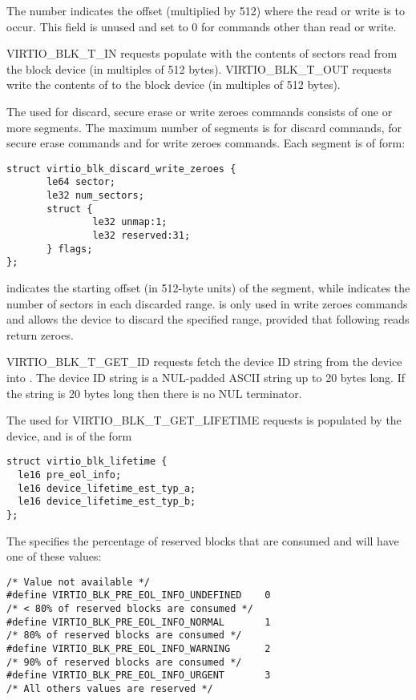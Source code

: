 The  number indicates the offset (multiplied by 512) where
the read or write is to occur. This field is unused and set to 0 for
commands other than read or write.

VIRTIO_BLK_T_IN requests populate  with the contents of sectors
read from the block device (in multiples of 512 bytes).  VIRTIO_BLK_T_OUT
requests write the contents of  to the block device (in multiples
of 512 bytes).

The  used for discard, secure erase or write zeroes commands
consists of one or more segments. The maximum number of segments is
 for discard commands,  for
secure erase commands and  for write zeroes
commands.
Each segment is of form:

\begin{lstlisting}
struct virtio_blk_discard_write_zeroes {
       le64 sector;
       le32 num_sectors;
       struct {
               le32 unmap:1;
               le32 reserved:31;
       } flags;
};
\end{lstlisting}

 indicates the starting offset (in 512-byte units) of the
segment, while  indicates the number of sectors in each
discarded range.  is only used in write zeroes commands and allows
the device to discard the specified range, provided that following reads return
zeroes.

VIRTIO_BLK_T_GET_ID requests fetch the device ID string from the device into
.  The device ID string is a NUL-padded ASCII string up to 20 bytes
long.  If the string is 20 bytes long then there is no NUL terminator.

The  used for VIRTIO_BLK_T_GET_LIFETIME requests is populated
by the device, and is of the form

\begin{lstlisting}
struct virtio_blk_lifetime {
  le16 pre_eol_info;
  le16 device_lifetime_est_typ_a;
  le16 device_lifetime_est_typ_b;
};
\end{lstlisting}

The  specifies the percentage of reserved blocks
that are consumed and will have one of these values:

\begin{lstlisting}
/* Value not available */
#define VIRTIO_BLK_PRE_EOL_INFO_UNDEFINED    0
/* < 80% of reserved blocks are consumed */
#define VIRTIO_BLK_PRE_EOL_INFO_NORMAL       1
/* 80% of reserved blocks are consumed */
#define VIRTIO_BLK_PRE_EOL_INFO_WARNING      2
/* 90% of reserved blocks are consumed */
#define VIRTIO_BLK_PRE_EOL_INFO_URGENT       3
/* All others values are reserved */
\end{lstlisting}

